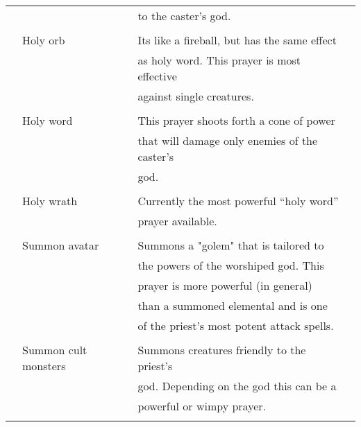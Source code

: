 {{{\begin{table}
\begin{center}
\begin{tabular}{|p{0.5cm}llp{0.5cm}|}
&                                     &  to the caster's god. & \\ 
 & & & \\ 
&        Holy orb              &  Its like a fireball, but has the same effect & \\
&			     &  as holy word\tablenotemark{2}. This prayer is most effective & \\
&			& against single creatures. & \\
 & & & \\ 
&        Holy word\tablenotemark{2} &  This prayer shoots forth a cone of power & \\
&				     &  that will damage only enemies of the caster's & \\
       &                              &  god. & \\
 & & & \\ 
       & Holy wrath           &  Currently the most powerful ``holy word''\tablenotemark{2} & \\ 
       &                              &  prayer available. & \\ 
 & & & \\ 
       & Summon avatar         &  Summons a "golem" that is tailored to & \\ 
       &                              &  the powers of the worshiped god. This & \\ 
       &                              &  prayer is more powerful (in general) & \\ 
       &                              &  than a summoned elemental and is one & \\ 
       &                              &  of the priest's most potent attack spells. & \\ 
 & & & \\ 
       & Summon cult monsters  &  	Summons creatures friendly to the priest's & \\
       &                              &  god. Depending on the god this can be a & \\ 
       &                              &   powerful or wimpy prayer. & \\ 
 & & & \\ 
\hline
\end{tabular}
\end{center}
\end{table}
 
}}}
